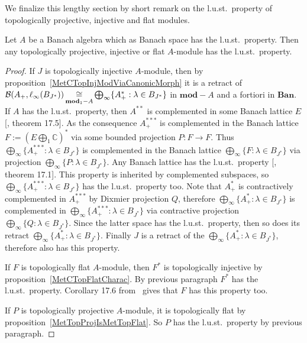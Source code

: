 We finalize this lengthy section by short remark on the l.u.st.\ property of
topologically projective, injective and flat modules. 

\begin{proposition} Let $A$ be a Banach algebra which as Banach space has the
l.u.st.\ property. Then any topologically projective, injective or flat
$A$-module has the l.u.st.\ property.
\end{proposition}
\begin{proof} 

If $J$ is topologically injective $A$-module, then by
proposition~\ref{MetCTopInjModViaCanonicMorph} it is a retract of
$\mathcal{B}(A_+,\ell_\infty(B_{J^*}))
\mathop{\mathbin{\cong}}\limits_{\mathbf{mod}_1-A}
\bigoplus_\infty \{ A_+^*:\lambda\in B_{J^*} \}$ 
in $\mathbf{mod}-A$ and a fortiori in $\mathbf{Ban}$. If $A$ has 
the l.u.st.\ property, then $A^{**}$ is complemented
in some Banach lattice $E$ [\cite{DiestAbsSumOps}, theorem 17.5]. As the
consequence $A_+^{***}$ is complemented in the Banach lattice
$F:={\left(E\bigoplus_1\mathbb{C}\right)}^*$ via some bounded projection 
$P:F\to F$. Thus $\bigoplus_\infty \{A_+^{***}:\lambda\in B_{J^*} \}$ is 
complemented in the Banach lattice $\bigoplus_\infty \{F:\lambda\in B_{J^*} \}$ 
via projection $\bigoplus_\infty \{ P:\lambda\in B_{J^*} \}$. Any Banach 
lattice has the l.u.st.\ property [\cite{DiestAbsSumOps}, theorem 17.1]. 
This property is inherited by complemented subspaces, 
so $\bigoplus_\infty \{A_+^{***}:\lambda\in B_{J^*} \}$ has 
the l.u.st.\ property too. Note that $A_+^*$ is contractively
complemented in $A_+^{***}$ by Dixmier projection $Q$, therefore
$\bigoplus_\infty \{A_+^*:\lambda\in B_{J^*} \}$ is complemented in
$\bigoplus_\infty \{A_+^{***}:\lambda\in B_{J^*} \}$ via contractive projection
$\bigoplus_\infty \{Q:\lambda\in B_{J^*} \}$. Since the latter space has the
l.u.st.\ property, then so does its 
retract $\bigoplus_\infty \{A_+^*:\lambda\in B_{J^*} \}$. Finally $J$ is a 
retract of the $\bigoplus_\infty \{A_+^*:\lambda\in B_{J^*} \}$, therefore 
also has this property.

If $F$ is topologically flat $A$-module, then $F^*$ is topologically injective
by proposition~\ref{MetCTopFlatCharac}. By previous paragraph $F^*$ has the
l.u.st.\ property. Corollary 17.6 from~\cite{DiestAbsSumOps} gives that $F$ has
this property too.

If $P$ is topologically projective $A$-module, it is topologically flat by
proposition~\ref{MetTopProjIsMetTopFlat}. So $P$ has the l.u.st.\ property by
previous paragraph.
\end{proof}

